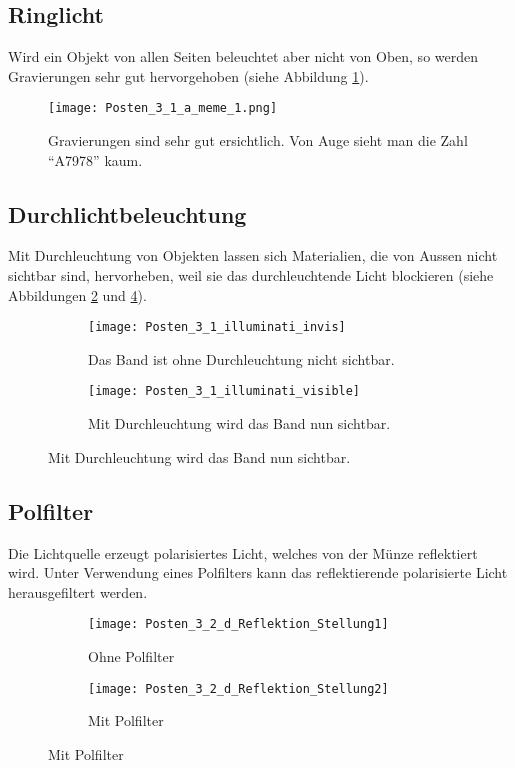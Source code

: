 \subsection{Ringlicht}

Wird  ein  Objekt  von allen Seiten beleuchtet aber nicht von Oben, so  werden
Gravierungen sehr gut hervorgehoben (siehe Abbildung \ref{fig:muenzen}).

\begin{figure}[h!]
    \centering
    \texttt{[image: Posten\_3\_1\_a\_meme\_1.png]}
    \caption{Gravierungen sind sehr gut ersichtlich. Von Auge sieht man die Zahl ``A7978'' kaum.}
    \label{fig:muenzen}
\end{figure}


\subsection{Durchlichtbeleuchtung}

Mit Durchleuchtung  von Objekten lassen sich Materialien, die von Aussen nicht
sichtbar sind, hervorheben, weil  sie  das  durchleuchtende  Licht  blockieren
(siehe Abbildungen \ref{fig:note1} und \ref{fig:note2}).

\begin{figure}[h!]
    \centering
    \begin{subfigure}[b]{.45\linewidth}
        \texttt{[image: Posten\_3\_1\_illuminati\_invis]}
        \caption{Das Band ist ohne Durchleuchtung nicht sichtbar.}
        \label{fig:note1}
    \end{subfigure}
    \begin{subfigure}[b]{.45\linewidth}
        \texttt{[image: Posten\_3\_1\_illuminati\_visible]}
        \caption{Mit Durchleuchtung wird das Band nun sichtbar.}
        \label{fig:note2}
    \end{subfigure}
\end{figure}


\newpage
\subsection{Polfilter}

Die  Lichtquelle   erzeugt   polarisiertes  Licht,  welches  von  der  M\"unze
reflektiert wird. Unter  Verwendung  eines  Polfilters kann das reflektierende
polarisierte Licht herausgefiltert werden.

\begin{figure}[h!]
    \centering
    \begin{subfigure}[b]{.45\linewidth}
        \texttt{[image: Posten\_3\_2\_d\_Reflektion\_Stellung1]}
        \caption{Ohne Polfilter}
    \end{subfigure}
    \begin{subfigure}[b]{.45\linewidth}
        \texttt{[image: Posten\_3\_2\_d\_Reflektion\_Stellung2]}
        \caption{Mit Polfilter}
    \end{subfigure}
\end{figure}


